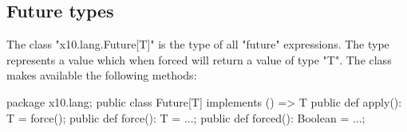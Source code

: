 \subsection{Future types}

The class \xcd"x10.lang.Future[T]"
is the type of all \xcd"future" expressions.
The type represents a value which when forced will return a value of type
\xcd"T". The class makes available the following methods:

\begin{xten}
package x10.lang;
public class Future[T] implements () => T {
  public def apply(): T = force();
  public def force(): T = ...;
  public def forced(): Boolean = ...;
}
\end{xten}
  
